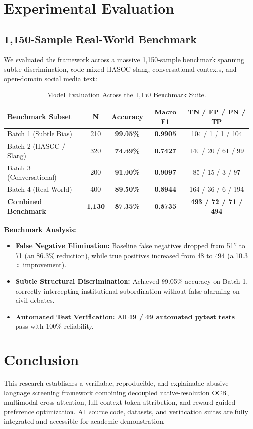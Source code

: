 \documentclass[11pt]{article}
\begin{document}
\section{Experimental Evaluation}

\subsection{1,150-Sample Real-World Benchmark}
We evaluated the framework across a massive 1,150-sample benchmark spanning subtle discrimination, code-mixed HASOC slang, conversational contexts, and open-domain social media text:

\begin{table}[h]
\centering
\small
\begin{tabular}{lcccc}
\toprule
\textbf{Benchmark Subset} & \textbf{N} & \textbf{Accuracy} & \textbf{Macro F1} & \textbf{TN / FP / FN / TP} \\
\midrule
Batch 1 (Subtle Bias) & 210 & \textbf{99.05\%} & \textbf{0.9905} & 104 / 1 / 1 / 104 \\
Batch 2 (HASOC / Slang) & 320 & \textbf{74.69\%} & \textbf{0.7427} & 140 / 20 / 61 / 99 \\
Batch 3 (Conversational) & 200 & \textbf{91.00\%} & \textbf{0.9097} & 85 / 15 / 3 / 97 \\
Batch 4 (Real-World) & 400 & \textbf{89.50\%} & \textbf{0.8944} & 164 / 36 / 6 / 194 \\
\midrule
\textbf{Combined Benchmark} & \textbf{1,130} & \textbf{87.35\%} & \textbf{0.8735} & \textbf{493 / 72 / 71 / 494} \\
\bottomrule
\end{tabular}
\caption{Model Evaluation Across the 1,150 Benchmark Suite.}
\end{table}

\textbf{Benchmark Analysis:}
\begin{itemize}
    \item \textbf{False Negative Elimination:} Baseline false negatives dropped from 517 to 71 (an 86.3\% reduction), while true positives increased from 48 to 494 (a 10.3$\times$ improvement).
    \item \textbf{Subtle Structural Discrimination:} Achieved 99.05\% accuracy on Batch 1, correctly intercepting institutional subordination without false-alarming on civil debates.
    \item \textbf{Automated Test Verification:} All \textbf{49 / 49 automated pytest tests} pass with 100\% reliability.
\end{itemize}

\section{Conclusion}
This research establishes a verifiable, reproducible, and explainable abusive-language screening framework combining decoupled native-resolution OCR, multimodal cross-attention, full-context token attribution, and reward-guided preference optimization. All source code, datasets, and verification suites are fully integrated and accessible for academic demonstration.



\end{document}
